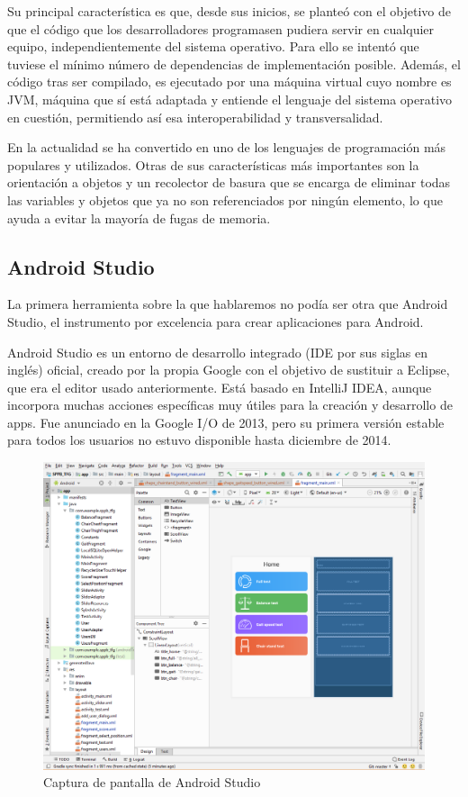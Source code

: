 Su principal característica es que, desde sus inicios, se planteó con el objetivo de que el código que los desarrolladores programasen pudiera servir en cualquier equipo, independientemente del sistema operativo. Para ello se intentó que tuviese el mínimo número de dependencias de implementación posible. Además, el código tras ser compilado, es ejecutado por una máquina virtual cuyo nombre es JVM, máquina que sí está adaptada y entiende el lenguaje del sistema operativo en cuestión, permitiendo así esa interoperabilidad y transversalidad.

En la actualidad se ha convertido en uno de los lenguajes de programación más populares y utilizados. Otras de sus características más importantes son la orientación a objetos y un recolector de basura que se encarga de eliminar todas las variables y objetos que ya no son referenciados por ningún elemento, lo que ayuda a evitar la mayoría de fugas de memoria\cite{java_wikipedia}.

\subsection{Android Studio}
La primera herramienta sobre la que hablaremos no podía ser otra que Android Studio, el instrumento por excelencia para crear aplicaciones para Android.

Android Studio es un entorno de desarrollo integrado (IDE por sus siglas en inglés) oficial, creado por la propia Google con el objetivo de sustituir a Eclipse, que era el editor usado anteriormente. Está basado en IntelliJ IDEA, aunque incorpora muchas acciones específicas muy útiles para la creación y desarrollo de apps. Fue anunciado en la Google I/O de 2013, pero su primera versión estable para todos los usuarios no estuvo disponible hasta diciembre de 2014\cite{android_developers, androidstudio_wikipedia}.

\begin{figure}[H]
	\centering
	\includegraphics[scale=0.41]{imagenes/android_studio.png}
	\caption{Captura de pantalla de Android Studio\label{fig:android_studio}}
\end{figure}

